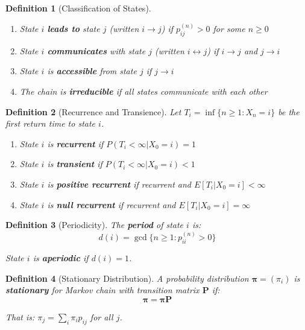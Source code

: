 \documentclass[12pt,a4paper]{article}
\newtheorem{definition}{Definition}[section]
\theoremstyle{remark}
\begin{document}
\begin{definition}[Classification of States]
\begin{enumerate}
\item State $i$ \textbf{leads to} state $j$ (written $i \to j$) if $p_{ij}^{(n)} > 0$ for some $n \geq 0$
\item State $i$ \textbf{communicates} with state $j$ (written $i \leftrightarrow j$) if $i \to j$ and $j \to i$
\item State $i$ is \textbf{accessible} from state $j$ if $j \to i$
\item The chain is \textbf{irreducible} if all states communicate with each other
\end{enumerate}
\end{definition}

\begin{definition}[Recurrence and Transience]
Let $T_i = \inf\{n \geq 1: X_n = i\}$ be the first return time to state $i$.
\begin{enumerate}
\item State $i$ is \textbf{recurrent} if $P(T_i < \infty | X_0 = i) = 1$
\item State $i$ is \textbf{transient} if $P(T_i < \infty | X_0 = i) < 1$
\item State $i$ is \textbf{positive recurrent} if recurrent and $E[T_i | X_0 = i] < \infty$
\item State $i$ is \textbf{null recurrent} if recurrent and $E[T_i | X_0 = i] = \infty$
\end{enumerate}
\end{definition}

\begin{definition}[Periodicity]
The \textbf{period} of state $i$ is:
$$d(i) = \gcd\{n \geq 1: p_{ii}^{(n)} > 0\}$$

State $i$ is \textbf{aperiodic} if $d(i) = 1$.
\end{definition}

\begin{definition}[Stationary Distribution]
A probability distribution $\boldsymbol{\pi} = (\pi_i)$ is \textbf{stationary} for Markov chain with transition matrix $\mathbf{P}$ if:
$$\boldsymbol{\pi} = \boldsymbol{\pi} \mathbf{P}$$

That is: $\pi_j = \sum_i \pi_i p_{ij}$ for all $j$.
\end{definition}
\end{document}
